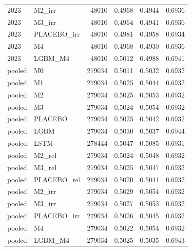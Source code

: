 \begin{tabular}{llrrrr}
2023 & M2\_irr & 48010 & 0.4968 & 0.4944 & 0.6936 \\
2023 & M3\_irr & 48010 & 0.4964 & 0.4941 & 0.6936 \\
2023 & PLACEBO\_irr & 48010 & 0.4981 & 0.4958 & 0.6934 \\
2023 & M4 & 48010 & 0.4968 & 0.4930 & 0.6936 \\
2023 & LGBM\_M4 & 48010 & 0.5012 & 0.4988 & 0.6941 \\
pooled & M0 & 279034 & 0.5011 & 0.5032 & 0.6932 \\
pooled & M1 & 279034 & 0.5025 & 0.5044 & 0.6932 \\
pooled & M2 & 279034 & 0.5025 & 0.5053 & 0.6932 \\
pooled & M3 & 279034 & 0.5024 & 0.5054 & 0.6932 \\
pooled & PLACEBO & 279034 & 0.5025 & 0.5042 & 0.6932 \\
pooled & LGBM & 279034 & 0.5030 & 0.5037 & 0.6944 \\
pooled & LSTM & 278444 & 0.5047 & 0.5085 & 0.6931 \\
pooled & M2\_rel & 279034 & 0.5024 & 0.5048 & 0.6932 \\
pooled & M3\_rel & 279034 & 0.5025 & 0.5047 & 0.6932 \\
pooled & PLACEBO\_rel & 279034 & 0.5020 & 0.5041 & 0.6932 \\
pooled & M2\_irr & 279034 & 0.5029 & 0.5054 & 0.6932 \\
pooled & M3\_irr & 279034 & 0.5027 & 0.5053 & 0.6932 \\
pooled & PLACEBO\_irr & 279034 & 0.5026 & 0.5045 & 0.6932 \\
pooled & M4 & 279034 & 0.5022 & 0.5054 & 0.6932 \\
pooled & LGBM\_M4 & 279034 & 0.5025 & 0.5035 & 0.6943 \\
\bottomrule
\end{tabular}
